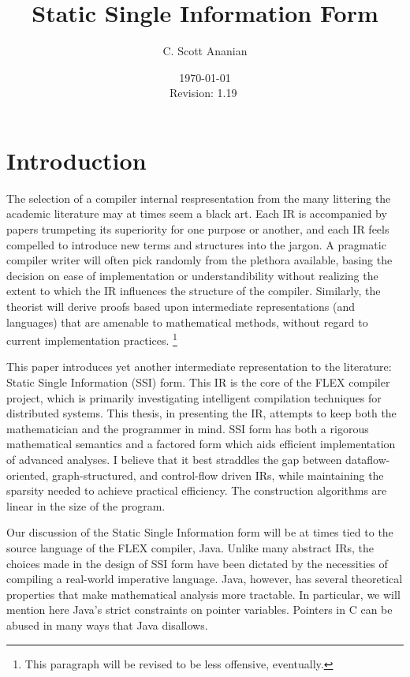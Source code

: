 \documentclass[12pt,notitlepage]{article}
\title{Static Single Information Form}
\author{C. Scott Ananian}
\date{\today \\ $ $Revision: 1.19 $ $}
\begin{document}
\pagestyle{myheadings}


\maketitle

\section{Introduction}
The selection of a compiler internal respresentation from the many
littering the academic literature may at times seem a black art.  Each
IR is accompanied by papers trumpeting its superiority for one purpose
or another, and each IR feels compelled to introduce new terms and
structures into the jargon.  A pragmatic compiler writer will often
pick randomly from the plethora available, basing the decision on ease
of implementation or understandibility without realizing the extent to
which the IR influences the structure of the compiler.  Similarly, the
theorist will derive proofs based upon intermediate representations
(and languages) that are amenable to mathematical methods, without
regard to current implementation practices.%
\footnote{This paragraph will be revised to be less offensive, eventually.}

This paper introduces yet another intermediate
representation to the literature:  Static Single Information (SSI) form.
This IR is the core of the FLEX compiler project, which is primarily
investigating intelligent compilation techniques for distributed
systems.  This thesis, in presenting the IR,
attempts to keep both the mathematician and the programmer in mind.  
SSI form has both a rigorous mathematical semantics and a factored
form which aids efficient implementation of advanced analyses.
I believe that it best straddles the gap between dataflow-oriented,
graph-structured, and control-flow driven IRs, while maintaining the
sparsity needed to achieve practical efficiency.  The construction
algorithms are linear in the size of the program.

Our discussion of the Static Single Information form will be at times
tied to the source language of the FLEX compiler, Java.  Unlike many
abstract IRs, the choices made in the design of SSI form have been
dictated by the necessities of compiling a real-world imperative
language.  Java, however, has several theoretical properties that make
mathematical analysis more tractable.  In particular, we
will mention here Java's strict constraints on pointer variables.
Pointers in C can be abused in many ways that Java disallows.
\end{document}
